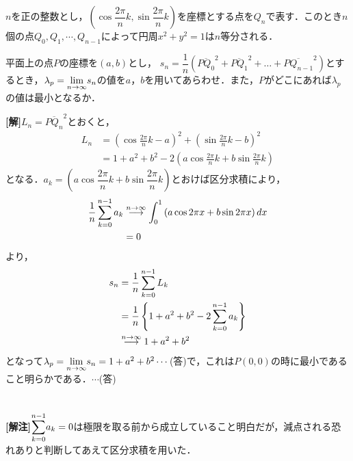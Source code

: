 \documentclass[a4j]{jarticle}
\title{}
\begin{document}

\begin{oframed}
$n$を正の整数とし，$\left(\cos \dfrac{2\pi}{n}k,\sin\dfrac{2\pi}{n}k\right)$を座標とする点を$Q_n$で表す．このとき$n$個の点$Q_0,Q_1,\cdots,Q_{n-1}$によって円周$x^2+y^2=1$は$n$等分される．

平面上の点$P$の座標を$(a,b)$とし，
$s_n=\dfrac{1}{n}\left(\overline{PQ_0}^2+\overline{PQ_1}^2+\dots+\overline{PQ_{n-1}}^2\right)$とするとき，$\lambda_p={\displaystyle \lim_{n\to\infty}}s_n$の値を$a$，$b$を用いてあらわせ．また，$P$がどこにあれば$\lambda_p$の値は最小となるか．
\end{oframed}

\setlength{\columnseprule}{0.4pt}
\begin{multicols}{2}
{\bf[解]}$L_n=\overline{PQ_n}^2$とおくと，
     \begin{align*}
     L_n&=\left(\cos\frac{2\pi}{n}k-a\right)^2+\left(\sin\frac{2\pi}{n}k-b\right)^2  \\
     &=1+a^2+b^2-2\left(a\cos\frac{2\pi}{n}k+b\sin\frac{2\pi}{n}k\right) 
     \end{align*}
となる．$a_k=\left(a\cos\dfrac{2\pi}{n}k+b\sin\dfrac{2\pi}{n}k\right)$とおけば区分求積により，
     \begin{align*}
     \frac{1}{n}\sum_{k=0}^{n-1}a_k
     &\stackrel{n \to \infty}{\longrightarrow}\int_0^1\left(a\cos2\pi x+b\sin2\pi x\right)dx \\
     &=0
     \end{align*}
より，
     \begin{align*}
     s_n&=\frac{1}{n}\sum_{k=0}^{n-1}L_k \\
     &=\frac{1}{n}\left\{1+a^2+b^2-2\sum_{k=0}^{n-1}a_k\right\} \\
     &\stackrel{n \to \infty}{\longrightarrow}1+a^2+b^2
     \end{align*}
となって$\lambda_p={\displaystyle \lim_{n\to\infty}}s_n=1+a^2+b^2\cdots$(答)で，これは$P(0,0)$の時に最小であること明らかである．$\cdots$(答)   
 \\
 \\
  \\
{\bf[解注]}${\displaystyle\sum_{k=0}^{n-1}}a_k=0$は極限を取る前から成立していること明白だが，減点される恐れありと判断してあえて区分求積を用いた．      
\newpage
\end{multicols}
\end{document}
